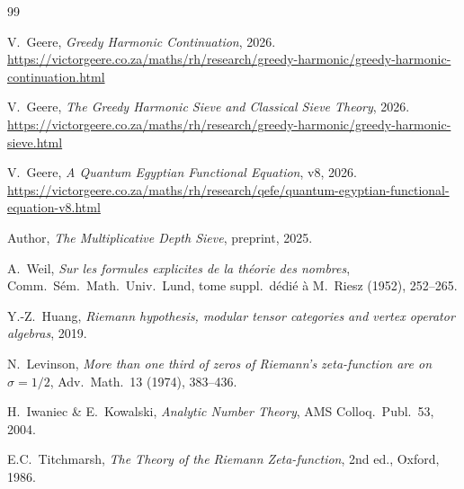 \documentclass[11pt,a4paper]{article}
\theoremstyle{remark}
\begin{document}
\begin{thebibliography}{99}

V.\ Geere, \emph{Greedy Harmonic Continuation}, 2026.\\
\url{https://victorgeere.co.za/maths/rh/research/greedy-harmonic/greedy-harmonic-continuation.html}

V.\ Geere, \emph{The Greedy Harmonic Sieve and Classical Sieve Theory}, 2026.\\
\url{https://victorgeere.co.za/maths/rh/research/greedy-harmonic/greedy-harmonic-sieve.html}

V.\ Geere, \emph{A Quantum Egyptian Functional Equation}, v8, 2026.\\
\url{https://victorgeere.co.za/maths/rh/research/qefe/quantum-egyptian-functional-equation-v8.html}

Author, \emph{The Multiplicative Depth Sieve}, preprint, 2025.

A.\ Weil, \emph{Sur les formules explicites de la th\'eorie des nombres}, Comm.\ S\'em.\ Math.\ Univ.\ Lund, tome suppl.\ d\'edi\'e \`a M.\ Riesz (1952), 252--265.

Y.-Z.\ Huang, \emph{Riemann hypothesis, modular tensor categories and vertex operator algebras}, 2019.

N.\ Levinson, \emph{More than one third of zeros of Riemann's zeta-function are on \(\sigma=1/2\)}, Adv.\ Math.\ 13 (1974), 383--436.

H.\ Iwaniec \& E.\ Kowalski, \emph{Analytic Number Theory}, AMS Colloq.\ Publ.\ 53, 2004.

E.C.\ Titchmarsh, \emph{The Theory of the Riemann Zeta-function}, 2nd ed., Oxford, 1986.

\end{thebibliography}
\end{document}
